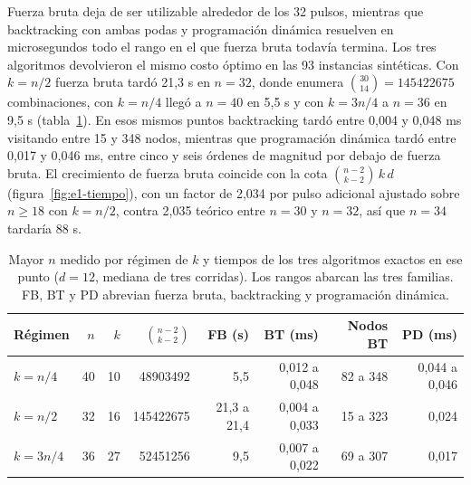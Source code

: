 Fuerza bruta deja de ser utilizable alrededor de los 32 pulsos, mientras que backtracking con ambas podas y programación dinámica resuelven en microsegundos todo el rango en el que fuerza bruta todavía termina. Los tres algoritmos devolvieron el mismo costo óptimo en las 93 instancias sintéticas. Con $k = n/2$ fuerza bruta tardó 21,3 s en $n = 32$, donde enumera $\binom{30}{14} = \num{145422675}$ combinaciones, con $k = n/4$ llegó a $n = 40$ en 5,5 s y con $k = 3n/4$ a $n = 36$ en 9,5 s (tabla~\ref{tab:e1-frontera}). En esos mismos puntos backtracking tardó entre 0,004 y 0,048 ms visitando entre 15 y 348 nodos, mientras que programación dinámica tardó entre 0,017 y 0,046 ms, entre cinco y seis órdenes de magnitud por debajo de fuerza bruta. El crecimiento de fuerza bruta coincide con la cota $\binom{n-2}{k-2}\,k\,d$ (figura~\ref{fig:e1-tiempo}), con un factor de 2,034 por pulso adicional ajustado sobre $n \ge 18$ con $k = n/2$, contra 2,035 teórico entre $n = 30$ y $n = 32$, así que $n = 34$ tardaría 88 s.

\begin{table}[tbp]
\centering
\caption{Mayor $n$ medido por régimen de $k$ y tiempos de los tres algoritmos exactos en ese punto ($d = 12$, mediana de tres corridas). Los rangos abarcan las tres familias. FB, BT y PD abrevian fuerza bruta, backtracking y programación dinámica.}
\label{tab:e1-frontera}
\begin{tabular}{lrrrrrrr}
\toprule
Régimen & $n$ & $k$ & $\binom{n-2}{k-2}$ & FB (s) & BT (ms) & Nodos BT & PD (ms) \\
\midrule
$k = n/4$  & 40 & 10 & \num{48903492} & 5,5 & 0,012 a 0,048 & 82 a 348 & 0,044 a 0,046 \\
$k = n/2$  & 32 & 16 & \num{145422675} & 21,3 a 21,4 & 0,004 a 0,033 & 15 a 323 & 0,024 \\
$k = 3n/4$ & 36 & 27 & \num{52451256} & 9,5 & 0,007 a 0,022 & 69 a 307 & 0,017 \\
\bottomrule
\end{tabular}
\end{table}

